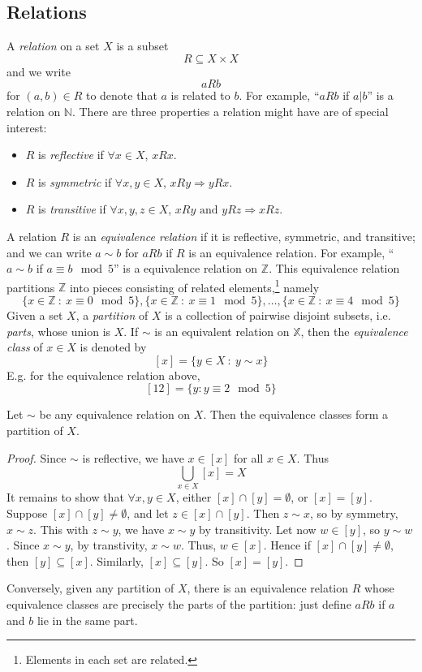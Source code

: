 \documentclass[10pt, a4paper, twoside]{report}
\begin{document}
\subsection{Relations}
A \emph{relation} on a set \(X\) is a subset 
\[R\subseteq X\times X\]
and we write 
\[aRb\]
for \((a,b)\in R\) to denote that \(a\) is related to \(b\). For example, ``\(aRb\) if \(a|b\)'' is a relation on \(\mathbb{N}\). There are three properties a relation might have are of special interest:
\begin{itemize}
    \item \(R\) is \emph{reflective} if \(\forall x\in X\), \(xRx\).
    \item \(R\) is \emph{symmetric} if \(\forall x,y\in X\), \(xRy\Rightarrow yRx\).
    \item \(R\) is \emph{transitive} if \(\forall x,y,z\in X\), \(xRy\text{  and  }yRz\Rightarrow xRz\).
\end{itemize}
A relation \(R\) is an \emph{equivalence relation} if it is reflective, symmetric, and transitive; and we can write \(a\sim b\) for \(aRb\) if \(R\) is an equivalence relation. For example, ``\(a\sim b\) if \(a\equiv b\mod 5\)'' is a equivalence relation on \(\mathbb{Z}\). This equivalence relation partitions \(\mathbb{Z}\) into pieces consisting of related elements,\footnote{Elements in each set are related.} namely
\[\{x\in\mathbb{Z}\::\:x\equiv 0\mod 5\},\{x\in\mathbb{Z}\::\:x\equiv 1\mod 5\},\ldots,\{x\in\mathbb{Z}\::\:x\equiv 4\mod 5\}\] 
Given a set \(X\), a \emph{partition} of \(X\) is a collection of pairwise disjoint subsets, i.e. \emph{parts}, whose union is \(X\). If \(\sim\) is an equivalent relation on \(\mathbb{X}\), then the \emph{equivalence class} of \(x\in X\) is denoted by 
\[[x]=\{y\in X\::\:y\sim x\}\]
E.g. for the equivalence relation above,
\[[12]=\{y:y\equiv 2\mod 5\}\]
\begin{theorem}
    Let \(\sim\) be any equivalence relation on \(X\). Then the equivalence classes form a partition of \(X\).
\end{theorem}
\begin{proof}
    Since \(\sim\) is reflective, we have \(x\in[x]\) for all \(x\in X\). Thus 
    \[\bigcup_{x\in X}[x]=X\]
    It remains to show that \(\forall x,y\in X\), either \([x]\cap[y]=\emptyset\), or \([x]=[y]\). Suppose \([x]\cap[y]\neq\emptyset\), and let \(z\in[x]\cap[y]\). Then \(z\sim x\), so by symmetry, \(x\sim z\). This with \(z\sim y\), we have \(x\sim y\) by transitivity. Let now \(w\in[y]\), so \(y\sim w\). Since \(x\sim y\), by transtivity, \(x\sim w\). Thus, \(w\in [x]\). Hence if \([x]\cap[y]\neq\emptyset\), then \([y]\subseteq[x]\). Similarly, \([x]\subseteq[y]\). \newline So \([x]=[y]\).
\end{proof}
Conversely, given any partition of \(X\), there is an equivalence relation \(R\) whose equivalence classes are precisely the parts of the partition: just define \(aRb\) if \(a\) and \(b\) lie in the same part. 
\end{document}

